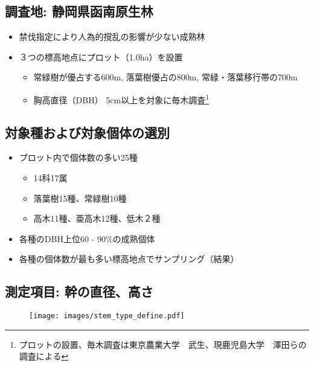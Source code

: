 \documentclass[a0, 30pt, plainboxedsections]{sciposter} %
\begin{document}
\begin{multicols}{3}\footnotesize{

\subsection*{\small{調査地: 静岡県函南原生林}}

\begin{itemize}\setlength{\itemindent}{1em}
  \item 禁伐指定により人為的撹乱の影響が少ない成熟林
  \item ３つの標高地点にプロット（1.0ha）を設置
  \begin{itemize}\setlength{\itemindent}{1em}
    \item 常緑樹が優占する600m, 落葉樹優占の800m, \newline 常緑・落葉移行帯の700m
    \item 胸高直径（DBH） 5cm以上を対象に毎木調査\footnote{プロットの設置、毎木調査は東京農業大学　武生、現鹿児島大学　澤田らの調査による}
  \end{itemize}
\end{itemize}

\subsection*{\small{対象種および対象個体の選別}}

\begin{itemize}\setlength{\itemindent}{1em}
  \item プロット内で個体数の多い25種
  \begin{itemize}\setlength{\itemindent}{1em}
    \item 14科17属
    \item 落葉樹15種、常緑樹10種
    \item 高木11種、亜高木12種、低木２種
  \end{itemize}
  \item 各種のDBH上位60 - 90\%の成熟個体
  \item 各種の個体数が最も多い標高地点でサンプリング（結果）
\end{itemize}

\columnbreak
\subsection*{\small{測定項目: 幹の直径、高さ}}

\begin{figure}
	\centering
	\texttt{[image: images/stem\_type\_define.pdf]}
\end{figure}

}
\end{multicols}
\end{document}
